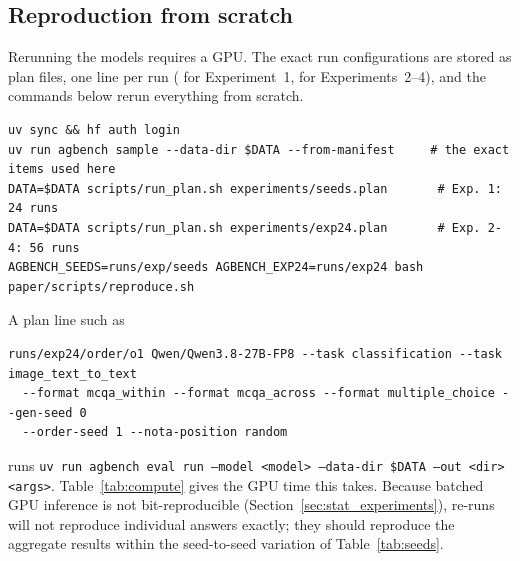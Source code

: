 \documentclass[10pt,letterpaper]{article}
\newcommand{\tablefont}{\footnotesize}
\newcommand{\code}[1]{\texttt{#1}}
\begin{document}
\subsection{Reproduction from scratch}
Rerunning the models requires a GPU. The exact run configurations are stored as plan files, one line per run ( for Experiment~1,  for Experiments~2--4), and the commands below rerun everything from scratch.
{\footnotesize
\begin{verbatim}
uv sync && hf auth login
uv run agbench sample --data-dir $DATA --from-manifest     # the exact items used here
DATA=$DATA scripts/run_plan.sh experiments/seeds.plan       # Exp. 1: 24 runs
DATA=$DATA scripts/run_plan.sh experiments/exp24.plan       # Exp. 2-4: 56 runs
AGBENCH_SEEDS=runs/exp/seeds AGBENCH_EXP24=runs/exp24 bash paper/scripts/reproduce.sh
\end{verbatim}
}
\noindent A plan line such as
{\footnotesize
\begin{verbatim}
runs/exp24/order/o1 Qwen/Qwen3.8-27B-FP8 --task classification --task image_text_to_text
  --format mcqa_within --format mcqa_across --format multiple_choice --gen-seed 0
  --order-seed 1 --nota-position random
\end{verbatim}
}
\noindent runs \code{uv run agbench eval run --model <model> --data-dir \$DATA --out <dir> <args>}. Table~\ref{tab:compute} gives the GPU time this takes. Because batched GPU inference is not bit-reproducible (Section~\ref{sec:stat_experiments}), re-runs will not reproduce individual answers exactly; they should reproduce the aggregate results within the seed-to-seed variation of Table~\ref{tab:seeds}.

\begin{table}[!tbp]
\centering
\caption{GPU time to reproduce the runs, one RTX 6000 Ada (48\,GB) per run, in hours including model loading. For Experiment~1 the columns give the mean per seed of generation and of LLM judging (the final judging pass), the total for all three seeds and the peak GPU memory during generation. For Experiments~2--4 they give the total over the model's runs (five option orders, two NOTA rates and IDK removed), with the number of runs in parentheses. $^\dagger$Also the LLM judge.}
\label{tab:compute}
\renewcommand{\arraystretch}{1.2}
\tablefont

\end{table}
\end{document}
